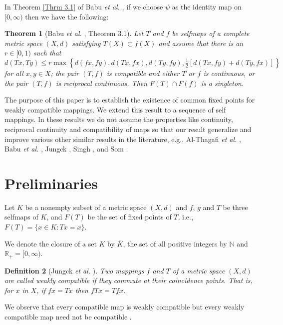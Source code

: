\documentclass[a4paper,12pt,oneside]{article}
\newtheorem{theorem}{Theorem}[section]
\newtheorem{definition}[theorem]{Definition}
\numberwithin{equation}{section}
\begin{document}
In Theorem \eqref{Thrm 3.1} of Babu \emph{et al.} \cite{Babu2007}, if we choose $\psi$ as the identity map on $[0,\infty)$ then we have the following:

\begin{theorem}[Babu \emph{et al.} \cite{Babu2007}, Theorem 3.1] \label{thrm 1.8}
Let $T$ and $f$ be selfmaps of a complete metric space $(X,d)$ satisfying $T(X)\subset f(X)$ and assume that there is an $r\in[0,1)$ such that
\begin{equation}
d(Tx,Ty) \leq r \max\left\{d(fx,fy),d(Tx,fx),d(Ty,fy),\tfrac{1}{2}[d(Tx,fy)+d(Ty,fx)]\right\}
\end{equation}
for all $x,y\in X$; the pair $(T,f)$ is compatible and either $T$ or $f$ is continuous, or the pair $(T,f)$ is reciprocal continuous. Then $F(T)\cap F(f)$ is a singleton.
\end{theorem}

The purpose of this paper is to establish the existence of common fixed points for weakly compatible mappings. We extend this result to a sequence of self mappings. In these results we do not assume the properties like continuity, reciprocal continuity and compatibility of maps so that our result generalize and improve various other similar results in the literature, e.g., Al-Thagafi \emph{et al.} \cite{Al-Thagafi2006}, Babu \emph{et al.} \cite{Babu2007}, Jungck \cite{Jungck1976,Jungck1986}, Singh \cite{Singh1986,Singh1997a}, and Som \cite{Som2003}.

\section{Preliminaries}

Let $K$ be a nonempty subset of a metric space $(X,d)$ and $f$, $g$ and $T$ be three selfmaps of $K$, and $F(T)$ be the set of fixed points of $T$, i.e., $F(T) = \{x \in K : Tx = x\}$.

We denote the closure of a set $K$ by $\overline{K}$, the set of all positive integers by $\mathbb{N}$ and $\mathbb{R}_{+} = [0, \infty)$.

\begin{definition}[Jungck \emph{et al.} \cite{Jungck1998}]
Two mappings $f$ and $T$ of a metric space $(X,d)$ are called \textit{weakly compatible} if they commute at their coincidence points. That is, for $x$ in $X$, if $fx = Tx$ then $fTx = Tfx$.
\end{definition}

We observe that every compatible map is weakly compatible but every weakly compatible map need not be compatible \cite{Singh1997b}.
\end{document}
